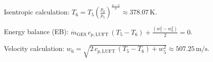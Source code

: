 Isentropic calculation:  
\( T_6 = T_5 \left( \frac{p_0}{p_5} \right)^{\frac{\kappa - 1}{\kappa}} \approx 378.07 \, \text{K} \).  

Energy balance (EB):  
\( \dot{m}_{\text{GES}} \, c_{p,\text{LUFT}} \, (T_5 - T_6) + \frac{(w_5^2 - w_6^2)}{2} = 0 \).  

Velocity calculation:  
\( w_6 = \sqrt{2 \, c_{p,\text{LUFT}} \, (T_5 - T_6) + w_5^2} \approx 507.25 \, \text{m/s} \).